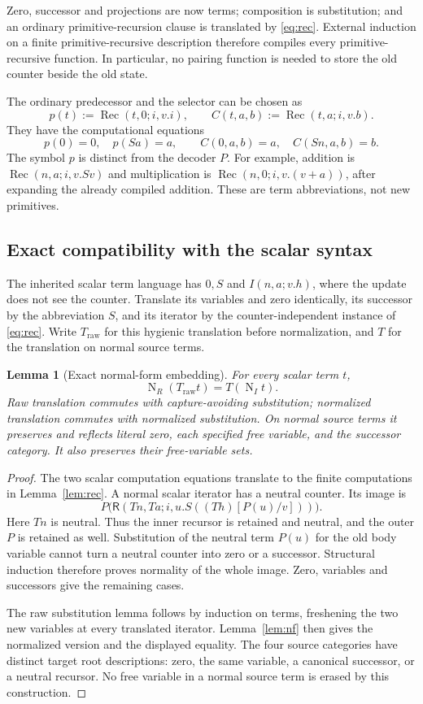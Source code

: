\documentclass[11pt]{article}
\newtheorem{lemma}[theorem]{Lemma}
\theoremstyle{definition}
\theoremstyle{remark}
\newcommand{\R}{\mathsf R}
\newcommand{\Rec}{\operatorname{Rec}}
\newcommand{\NF}{\operatorname{N}}
\begin{document}
Zero, successor and projections are now terms; composition is
substitution; and an ordinary primitive-recursion clause is
translated by \eqref{eq:rec}. External induction on a finite
primitive-recursive description therefore compiles every
primitive-recursive function. In particular, no pairing function
is needed to store the old counter beside the old state.

The ordinary predecessor and the selector can be chosen as
\[
 p(t):=\Rec(t,0;i,v.i),\qquad
 C(t,a,b):=\Rec(t,a;i,v.b).
\]
They have the computational equations
\[
 p(0)=0,\quad p(Sa)=a,\qquad
 C(0,a,b)=a,\quad C(Sn,a,b)=b.                               \tag{C}
\]
The symbol $p$ is distinct from the decoder $P$.
For example, addition is $\Rec(n,a;i,v.Sv)$ and multiplication
is $\Rec(n,0;i,v.(v+a))$, after expanding the already compiled
addition. These are term abbreviations, not new primitives.

\subsection{Exact compatibility with the scalar syntax}

The inherited scalar term language has $0,S$ and
$I(n,a;v.h)$, where the update does not see the counter.
Translate its variables and zero identically, its successor
by the abbreviation $S$, and its iterator by the
counter-independent instance of \eqref{eq:rec}.
Write $T_{\mathrm{raw}}$ for this hygienic translation before
normalization, and $T$ for the translation on normal source terms.

\begin{lemma}[Exact normal-form embedding]
\label{lem:embedding}
For every scalar term $t$,
\[
 \NF_R(T_{\mathrm{raw}}t)=T(\NF_I t).
\]
Raw translation commutes with capture-avoiding substitution;
normalized translation commutes with normalized substitution.
On normal source terms it preserves and reflects literal zero,
each specified free variable, and the successor category.
It also preserves their free-variable sets.
\end{lemma}
\begin{proof}
The two scalar computation equations translate to the finite
computations in Lemma~\ref{lem:rec}. A normal scalar iterator
has a neutral counter. Its image is
\[
 P\bigl(\R(Tn,Ta;i,u.S((Th)[P(u)/v]))\bigr).
\]
Here $Tn$ is neutral. Thus the inner recursor is retained and
neutral, and the outer $P$ is retained as well. Substitution
of the neutral term $P(u)$ for the old body variable cannot
turn a neutral counter into zero or a successor. Structural
induction therefore proves normality of the whole image.
Zero, variables and successors give the remaining cases.

The raw substitution lemma follows by induction on terms,
freshening the two new variables at every translated iterator.
Lemma~\ref{lem:nf} then gives the normalized version and the
displayed equality. The four source categories have distinct
target root descriptions: zero, the same variable, a canonical
successor, or a neutral recursor. No free variable in a normal
source term is erased by this construction.
\end{proof}
\end{document}
